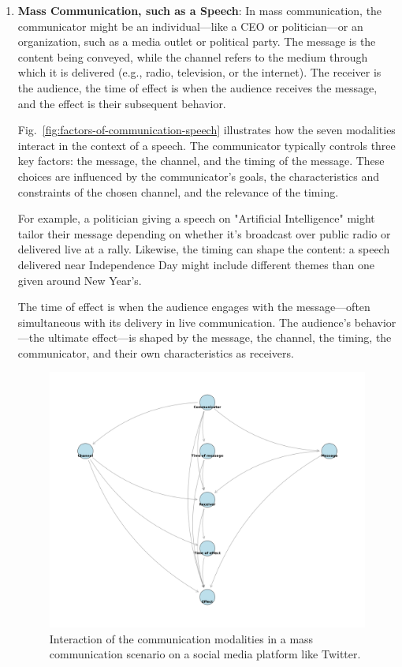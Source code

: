 \begin{enumerate}
    \item \textbf{Mass Communication, such as a Speech}: In mass communication, the communicator might be an individual—like a CEO or politician—or an organization, such as a media outlet or political party. The message is the content being conveyed, while the channel refers to the medium through which it is delivered (e.g., radio, television, or the internet). The receiver is the audience, the time of effect is when the audience receives the message, and the effect is their subsequent behavior.

    Fig.~\ref{fig:factors-of-communication-speech} illustrates how the seven modalities interact in the context of a speech. The communicator typically controls three key factors: the message, the channel, and the timing of the message. These choices are influenced by the communicator’s goals, the characteristics and constraints of the chosen channel, and the relevance of the timing.

    For example, a politician giving a speech on "Artificial Intelligence" might tailor their message depending on whether it’s broadcast over public radio or delivered live at a rally. Likewise, the timing can shape the content: a speech delivered near Independence Day might include different themes than one given around New Year’s.

    The time of effect is when the audience engages with the message—often simultaneous with its delivery in live communication. The audience’s behavior—the ultimate effect—is shaped by the message, the channel, the timing, the communicator, and their own characteristics as receivers.



\begin{figure}[!t]
    \centering
    \includegraphics[width=1.0\textwidth]{images/pgm_mass_communication_tweet.png}
    \caption{Interaction of the communication modalities in a mass communication scenario on a social media platform like Twitter. 
    \label{fig:factors-of-communication-tweet}}
  \end{figure}



\end{enumerate}
